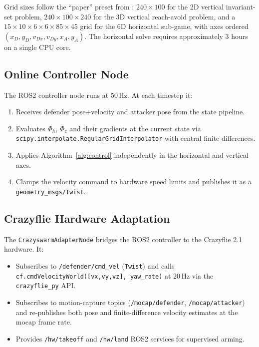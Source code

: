 \documentclass[conference]{IEEEtran}
\begin{document}
Grid sizes follow the ``paper'' preset from \cite{bui2025reach}: $240{\times}100$ for the 2D vertical invariant-set problem, $240{\times}100{\times}240$ for the 3D vertical reach-avoid problem, and a $15{\times}10{\times}6{\times}6{\times}85{\times}45$ grid for the 6D horizontal sub-game, with axes ordered $(x_D, y_D, v_{Dx}, v_{Dy}, x_A, y_A)$. The horizontal solve requires approximately 3 hours on a single CPU core.

\subsection{Online Controller Node}

The ROS2 controller node runs at 50\,Hz. At each timestep it:
\begin{enumerate}
  \item Receives defender pose+velocity and attacker pose from the state pipeline.
  \item Evaluates $\Phi_h$, $\Phi_z$ and their gradients at the current state via \texttt{scipy.interpolate.RegularGridInterpolator} with central finite differences.
  \item Applies Algorithm~\ref{alg:control} independently in the horizontal and vertical axes.
  \item Clamps the velocity command to hardware speed limits and publishes it as a \texttt{geometry\_msgs/Twist}.
\end{enumerate}

\subsection{Crazyflie Hardware Adaptation}

The \texttt{CrazyswarmAdapterNode} bridges the ROS2 controller to the Crazyflie 2.1 hardware. It:
\begin{itemize}
  \item Subscribes to \texttt{/defender/cmd\_vel} (\texttt{Twist}) and calls \texttt{cf.cmdVelocityWorld([vx,vy,vz], yaw\_rate)} at 20\,Hz via the \texttt{crazyflie\_py} API.
  \item Subscribes to motion-capture topics (\texttt{/mocap/defender}, \texttt{/mocap/attacker}) and re-publishes both pose and finite-difference velocity estimates at the mocap frame rate.
  \item Provides \texttt{/hw/takeoff} and \texttt{/hw/land} ROS2 services for supervised arming.
\end{itemize}
\end{document}
